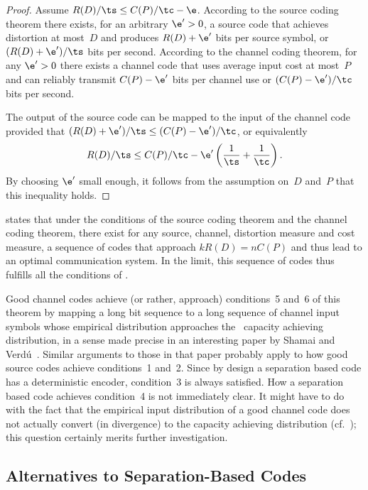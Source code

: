 \begin{proof}
  Assume $R(D)/\ts \le C(P)/\tc - \e$. According to the source coding theorem
  there exists, for an arbitrary $\e' > 0$, a source code that achieves
  distortion at most~$D$ and produces $R(D) + \e'$ bits per source symbol, or
  $(R(D) + \e')/\ts$ bits per second. According to the channel coding theorem,
  for any $\e' > 0$ there exists a channel code that uses average input
  cost at most~$P$ and can reliably transmit $C(P) - \e'$ bits per channel use
  or $(C(P) - \e')/\tc$ bits per second.

  The output of the source code can be mapped to the input of the channel code
  provided that $(R(D) + \e')/\ts \le (C(P) - \e')/\tc$, 
  or equivalently
  \[ R(D)/\ts \le C(P)/\tc - \e'\left(\frac{1}{\ts} + \frac{1}{\tc} \right). \]
  By choosing $\e'$ small enough, it follows from the assumption on~$D$ and~$P$
  that this inequality holds.
\end{proof}

 states that under the conditions of the source coding
theorem and the channel coding theorem, there exist for any source, channel,
distortion measure and cost measure, a sequence of codes that approach $k R(D) =
nC(P)$ and thus lead to an optimal communication system. In the limit, this
sequence of codes thus fulfills all the conditions of
.

Good channel codes achieve (or rather, approach) conditions~5 and~6 of this
theorem by mapping a long bit sequence to a long sequence of channel input
symbols whose empirical distribution approaches the \iid\ capacity achieving
distribution, in a sense made precise in an interesting paper by Shamai and
Verd\'u~\cite{ShamaiV1997}. Similar arguments to those in that paper probably
apply to how good source codes achieve conditions~1 and~2. Since by design a
separation based code has a deterministic encoder, condition~3 is always
satisfied.  How a separation based code achieves condition~4 is not immediately
clear. It might have to do with the fact that the empirical input distribution
of a good channel code does not actually convert (in divergence) to the capacity
achieving distribution (cf.~\cite{ShamaiV1997}); this question certainly merits
further investigation.


\subsection{Alternatives to Separation-Based Codes}

